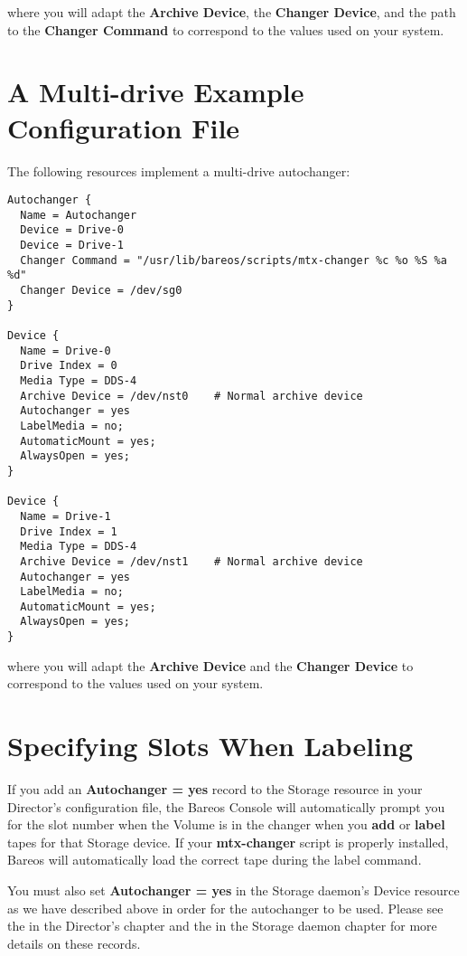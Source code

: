 where you will adapt the {\bf Archive Device}, the {\bf Changer Device}, and
the path to the {\bf Changer Command} to correspond to the values used on your
system.

\section{A Multi-drive Example Configuration File}

The following resources implement a multi-drive autochanger:

\footnotesize
\begin{verbatim}
Autochanger {
  Name = Autochanger
  Device = Drive-0
  Device = Drive-1
  Changer Command = "/usr/lib/bareos/scripts/mtx-changer %c %o %S %a %d"
  Changer Device = /dev/sg0
}

Device {
  Name = Drive-0
  Drive Index = 0
  Media Type = DDS-4
  Archive Device = /dev/nst0    # Normal archive device
  Autochanger = yes
  LabelMedia = no;
  AutomaticMount = yes;
  AlwaysOpen = yes;
}

Device {
  Name = Drive-1
  Drive Index = 1
  Media Type = DDS-4
  Archive Device = /dev/nst1    # Normal archive device
  Autochanger = yes
  LabelMedia = no;
  AutomaticMount = yes;
  AlwaysOpen = yes;
}
\end{verbatim}
\normalsize

where you will adapt the {\bf Archive Device} and the {\bf Changer Device} to correspond to the values used on your
system.


\section{Specifying Slots When Labeling}
\label{SpecifyingSlots}

If you add an {\bf Autochanger = yes} record to the Storage resource in your
Director's configuration file, the Bareos Console will automatically prompt
you for the slot number when the Volume is in the changer when
you {\bf add} or {\bf label} tapes for that Storage device. If your
{\bf mtx-changer} script is properly installed, Bareos will automatically
load the correct tape during the label command.

You must also set
{\bf Autochanger = yes} in the Storage daemon's Device resource
as we have described above in order for the autochanger to be used.
Please see the
 in the Director's chapter
and the
 in the Storage daemon
chapter for more details on these records.


